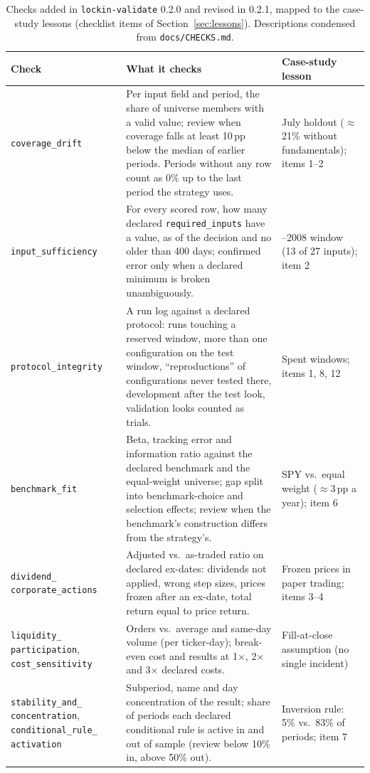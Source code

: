 \documentclass[11pt]{article}
\begin{document}
\begin{table}[t]
\centering
\caption{Checks added in \texttt{lockin-validate} 0.2.0 and revised in 0.2.1, mapped to the case-study lessons (checklist items of Section~\ref{sec:lessons}). Descriptions condensed from \texttt{docs/CHECKS.md}.}
\label{tab:newchecks}
\small
\begin{tabularx}{\textwidth}{>{\raggedright\arraybackslash}p{3.4cm}>{\raggedright\arraybackslash}X>{\raggedright\arraybackslash}p{3.3cm}}
\toprule
Check & What it checks & Case-study lesson \\
\midrule
\texttt{coverage\_drift} & Per input field and period, the share of universe members with a valid value; review when coverage falls at least 10\,pp below the median of earlier periods. Periods without any row count as 0\% up to the last period the strategy uses. & July holdout ($\approx$21\% without fundamentals); items 1--2 \\
\texttt{input\_sufficiency} & For every scored row, how many declared \texttt{required\_inputs} have a value, as of the decision and no older than 400 days; confirmed error only when a declared minimum is broken unambiguously. & 1999--2008 window (13 of 27 inputs); item 2 \\
\texttt{protocol\_integrity} & A run log against a declared protocol: runs touching a reserved window, more than one configuration on the test window, ``reproductions'' of configurations never tested there, development after the test look, validation looks counted as trials. & Spent windows; items 1, 8, 12 \\
\texttt{benchmark\_fit} & Beta, tracking error and information ratio against the declared benchmark and the equal-weight universe; gap split into benchmark-choice and selection effects; review when the benchmark's construction differs from the strategy's. & SPY vs.\ equal weight ($\approx$3\,pp a year); item 6 \\
\texttt{dividend\_} \texttt{corporate\_actions} & Adjusted vs.\ as-traded ratio on declared ex-dates: dividends not applied, wrong step sizes, prices frozen after an ex-date, total return equal to price return. & Frozen prices in paper trading; items 3--4 \\
\texttt{liquidity\_} \texttt{participation}, \texttt{cost\_sensitivity} & Orders vs.\ average and same-day volume (per ticker-day); break-even cost and results at 1$\times$, 2$\times$ and 3$\times$ declared costs. & Fill-at-close assumption (no single incident) \\
\texttt{stability\_and\_} \texttt{concentration}, \texttt{conditional\_rule\_} \texttt{activation} & Subperiod, name and day concentration of the result; share of periods each declared conditional rule is active in and out of sample (review below 10\% in, above 50\% out). & Inversion rule: 5\% vs.\ 83\% of periods; item 7 \\
\bottomrule
\end{tabularx}
\end{table}
\end{document}
